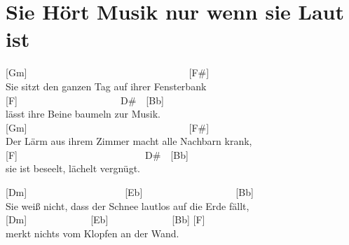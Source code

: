 \documentclass[
  letterpaper,
]{scrbook}
\begin{document}
\hypertarget{sie-huxf6rt-musik-nur-wenn-sie-laut-ist}{%
\chapter{Sie Hört Musik nur wenn sie Laut
ist}\label{sie-huxf6rt-musik-nur-wenn-sie-laut-ist}}

{[}Gm{]}~~~~~~~~~~~~~~~~~~~~~~~~~~~~~~~~~{[}F\#{]}\\
Sie sitzt den ganzen Tag auf ihrer Fensterbank\\
{[}F{]}~~~~~~~~~~~~~~~~~~~~~D\#~~{[}Bb{]}\\
lässt ihre Beine baumeln zur Musik.\\
{[}Gm{]}~~~~~~~~~~~~~~~~~~~~~~~~~~~~~~~~~{[}F\#{]}\\
Der Lärm aus ihrem Zimmer macht alle Nachbarn krank,\\
{[}F{]}~~~~~~~~~~~~~~~~~~~~~~~~~~D\#~~{[}Bb{]}\\
sie ist beseelt, lächelt vergnügt.

{[}Dm{]}~~~~~~~~~~~~~~~~~~~~{[}Eb{]}~~~~~~~~~~~~~~~~~~~{[}Bb{]}\\
Sie weiß nicht, dass der Schnee lautlos auf die Erde fällt,\\
{[}Dm{]}~~~~~~~~~~~~~{[}Eb{]}~~~~~~~~~~~~~{[}Bb{]} {[}F{]}\\
merkt nichts vom Klopfen an der Wand.
\end{document}
